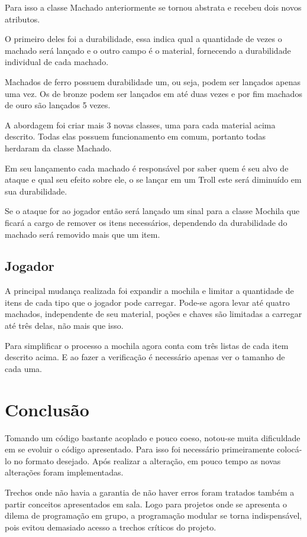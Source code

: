 \documentclass[runningheads,a4paper]{llncs}
\begin{document}
		Para isso a classe Machado anteriormente se tornou abstrata e recebeu dois novos atributos. 
	
		O primeiro deles foi a durabilidade, essa indica qual a quantidade de vezes o machado será lançado e o outro campo é o material, fornecendo a durabilidade individual de cada machado.
		
		Machados de ferro possuem durabilidade um, ou seja, podem ser lançados apenas uma vez. Os de bronze podem ser lançados em até duas vezes e por fim machados de ouro são lançados 5 vezes.
		
		A abordagem foi criar mais 3 novas classes, uma para cada material acima descrito. Todas elas possuem funcionamento em comum, portanto todas herdaram da classe Machado.
		
		Em seu lançamento cada machado é responsável por saber quem é seu alvo de ataque e qual seu efeito sobre ele, o se lançar em um Troll este será diminuído em sua durabilidade. 
		
		Se o ataque for ao jogador então será lançado um sinal para a classe Mochila que ficará a cargo de remover os itens necessários, dependendo da durabilidade do machado será removido mais que um item.
		
	\subsection{Jogador}
		A principal mudança realizada foi expandir a mochila e limitar a quantidade de itens de cada tipo que o jogador pode carregar. Pode-se agora levar até quatro machados, independente de seu material, poções e chaves são limitadas a carregar até três delas, não mais que isso. 
		
		Para simplificar o processo a mochila agora conta com três listas de cada item descrito acima. E ao fazer a verificação é necessário apenas ver o tamanho de cada uma. 

\section{Conclusão}
	Tomando um código bastante acoplado e pouco coeso, notou-se muita dificuldade em se evoluir o código apresentado. Para isso foi necessário primeiramente colocá-lo no formato desejado. Após realizar a alteração, em pouco tempo as novas alterações foram implementadas.
	
	Trechos onde não havia a garantia de não haver erros foram tratados também a partir conceitos apresentados em sala.	Logo para projetos onde se apresenta o dilema de programação em grupo, a programação modular se torna indispensável, pois evitou demasiado acesso a trechos críticos do projeto. 
	
\end{document}
